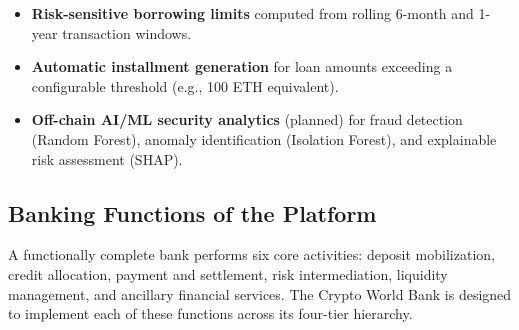 \documentclass[12pt,a4paper]{report}
\begin{document}
\begin{itemize}[noitemsep]
\item \textbf{Risk-sensitive borrowing limits} computed from rolling 6-month and 1-year transaction windows.
\item \textbf{Automatic installment generation} for loan amounts exceeding a configurable threshold (e.g., 100 ETH equivalent).
\item \textbf{Off-chain AI/ML security analytics} (planned) for fraud detection (Random Forest), anomaly identification (Isolation Forest), and explainable risk assessment (SHAP).
\end{itemize}

\subsection{Banking Functions of the Platform}

A functionally complete bank performs six core activities: deposit mobilization, credit allocation, payment and settlement, risk intermediation, liquidity management, and ancillary financial services. The Crypto World Bank is designed to implement each of these functions across its four-tier hierarchy.
\end{document}
